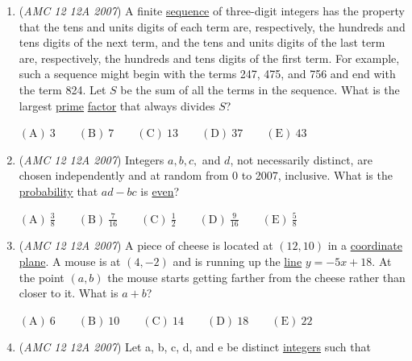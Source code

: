 \begin{enumerate}
 $\mathrm{(A)}\ 8.64\qquad \mathrm{(B)}\ 12\qquad \mathrm{(C)}\ 5\pi\qquad \mathrm{(D)}\ 17.28\qquad \mathrm{(E)}\ 18$


	\item (\textit{AMC 12 12A 2007}) A finite \href{https://artofproblemsolving.com/wiki/index.php?title=Sequence}{sequence} of three-digit integers has the property that the tens and units digits of each term are, respectively, the hundreds and tens digits of the next term, and the tens and units digits of the last term are, respectively, the hundreds and tens digits of the first term. For example, such a sequence might begin with the terms 247, 475, and 756 and end with the term 824. Let $S$ be the sum of all the terms in the sequence. What is the largest \href{https://artofproblemsolving.com/wiki/index.php?title=Prime}{prime} \href{https://artofproblemsolving.com/wiki/index.php?title=Factor}{factor} that always divides $S$? 


 $\mathrm{(A)}\ 3\qquad \mathrm{(B)}\ 7\qquad \mathrm{(C)}\ 13\qquad \mathrm{(D)}\ 37\qquad \mathrm{(E)}\ 43$


	\item (\textit{AMC 12 12A 2007}) Integers $a, b, c,$ and $d$, not necessarily distinct, are chosen independently and at random from 0 to 2007, inclusive. What is the \href{https://artofproblemsolving.com/wiki/index.php?title=Probability}{probability} that $ad-bc$ is \href{https://artofproblemsolving.com/wiki/index.php?title=Even}{even}?


 $\mathrm{(A)}\ \frac 38\qquad \mathrm{(B)}\ \frac 7{16}\qquad \mathrm{(C)}\ \frac 12\qquad \mathrm{(D)}\ \frac 9{16}\qquad \mathrm{(E)}\ \frac 58$


	\item (\textit{AMC 12 12A 2007}) A piece of cheese is located at $(12,10)$ in a \href{https://artofproblemsolving.com/wiki/index.php?title=Coordinate\_plane}{coordinate plane}. A mouse is at $(4,-2)$ and is running up the \href{https://artofproblemsolving.com/wiki/index.php?title=Line}{line} $y=-5x+18$. At the point $(a,b)$ the mouse starts getting farther from the cheese rather than closer to it. What is  $a+b$?


 $\mathrm{(A)}\ 6\qquad \mathrm{(B)}\ 10\qquad \mathrm{(C)}\ 14\qquad \mathrm{(D)}\ 18\qquad \mathrm{(E)}\ 22$


	\item (\textit{AMC 12 12A 2007}) Let a, b, c, d, and e be distinct \href{https://artofproblemsolving.com/wiki/index.php?title=Integer}{integers} such that



\end{enumerate}
